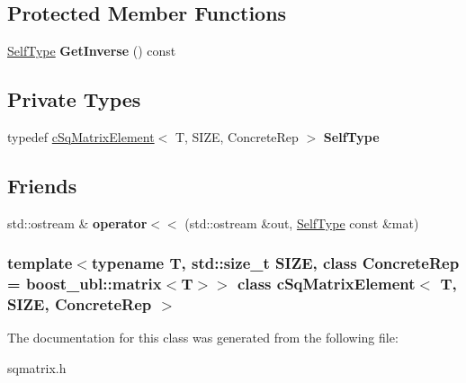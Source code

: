\subsection*{\-Protected \-Member \-Functions}
\begin{DoxyCompactItemize}
\item 
\hypertarget{classcSqMatrixElement_abb0ae8affc45bdf255e8cc11e0beb5d2}{\hyperlink{classcSqMatrixElement}{\-Self\-Type} {\bfseries \-Get\-Inverse} () const }\label{classcSqMatrixElement_abb0ae8affc45bdf255e8cc11e0beb5d2}

\end{DoxyCompactItemize}
\subsection*{\-Private \-Types}
\begin{DoxyCompactItemize}
\item 
\hypertarget{classcSqMatrixElement_a00de9a0b673c4b8981af9046bef4dcf0}{typedef \hyperlink{classcSqMatrixElement}{c\-Sq\-Matrix\-Element}$<$ \-T, \*
\-S\-I\-Z\-E, \-Concrete\-Rep $>$ {\bfseries \-Self\-Type}}\label{classcSqMatrixElement_a00de9a0b673c4b8981af9046bef4dcf0}

\end{DoxyCompactItemize}
\subsection*{\-Friends}
\begin{DoxyCompactItemize}
\item 
\hypertarget{classcSqMatrixElement_afad53b95d982a8dccd99c667c7ebd98d}{std\-::ostream \& {\bfseries operator$<$$<$} (std\-::ostream \&out, \hyperlink{classcSqMatrixElement}{\-Self\-Type} const \&mat)}\label{classcSqMatrixElement_afad53b95d982a8dccd99c667c7ebd98d}

\end{DoxyCompactItemize}
\subsubsection*{template$<$typename T, std\-::size\-\_\-t \-S\-I\-Z\-E, class Concrete\-Rep = boost\-\_\-ubl\-::matrix$<$\-T$>$$>$ class c\-Sq\-Matrix\-Element$<$ T, S\-I\-Z\-E, Concrete\-Rep $>$}



\-The documentation for this class was generated from the following file\-:\begin{DoxyCompactItemize}
\item 
sqmatrix.\-h\end{DoxyCompactItemize}
